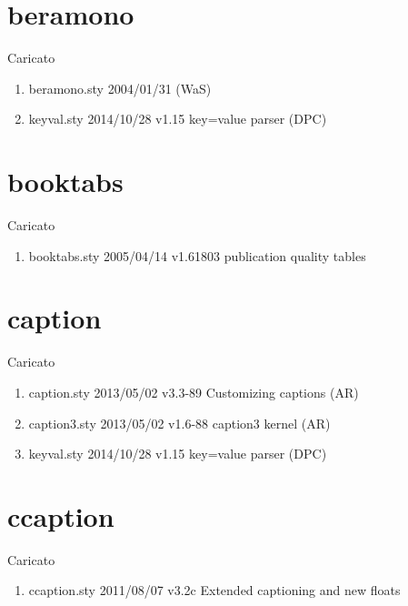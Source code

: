 \section{beramono}

Caricato 
\begin{enumerate}
\item beramono.sty    2004/01/31 (WaS)
\item keyval.sty    2014/10/28 v1.15 key=value parser (DPC)
\end{enumerate}
\section{booktabs}

Caricato 
\begin{enumerate}
\item booktabs.sty 2005/04/14 v1.61803 publication quality tables
\end{enumerate}
\section{caption}

Caricato
\begin{enumerate}
\item 	 caption.sty 2013/05/02 v3.3-89 Customizing captions (AR)
\item caption3.sty 2013/05/02 v1.6-88 caption3 kernel (AR)
\item keyval.sty 2014/10/28 v1.15 key=value parser (DPC)
\end{enumerate}
\section{ccaption}

Caricato
\begin{enumerate}
\item ccaption.sty 2011/08/07 v3.2c Extended captioning and new floats
\end{enumerate}
